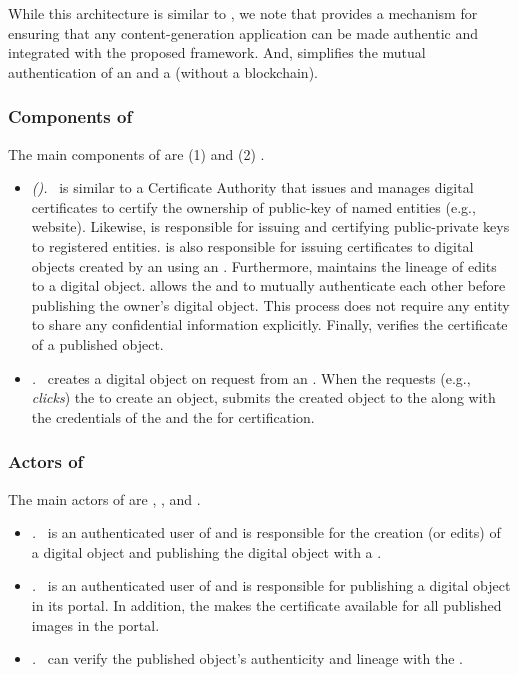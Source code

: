 While this architecture is similar to \cite{qqjs19}, we note that \name provides a mechanism for ensuring that any content-generation application can be made authentic and integrated with the proposed framework. And, \name simplifies the mutual authentication of an \owner and a \publisher (without a blockchain). 

\subsubsection{\bf Components of \name} 
The main components of \name are (1) \TA and (2) \AuthApp.

\begin{itemize}
  \item {\em \TA (\ta). } \
    \ta is similar to a Certificate Authority that issues and manages digital certificates to certify the ownership of public-key of named entities (e.g., website). Likewise, \ta is responsible for issuing and certifying public-private keys to registered entities. \ta is also responsible for issuing certificates to digital objects created by an \owner using an \authapp. Furthermore, \ta maintains the lineage of edits to a digital object. \ta allows the \publisher and \owner to mutually authenticate each other before publishing the owner's digital object. This process does not require any entity to share any confidential information explicitly. Finally, \ta verifies the certificate of a published object. 
  \item {\em \AuthApp. } \
    \AuthApp creates a digital object on request from an \owner. When the \owner requests (e.g., {\em clicks}) the \app to create an object, \app submits the created object to the \ta along with the credentials of the \app and the \owner for certification.
\end{itemize}

\subsubsection{\bf Actors of \name}
The main actors of \name are \owner, \publisher, and \reader. 

\begin{itemize}
  \item {\em \Owner. } \
    \Owner is an authenticated user of \ta and is responsible for the creation (or edits) of a digital object and publishing the digital object with a \publisher. 
  \item {\em \Publisher. } \
    \Publisher is an authenticated user of \ta and is responsible for publishing a digital object in its portal. In addition, the \publisher makes the certificate available for all published images in the portal. 
  \item {\em \Reader. } \
    \Reader can verify the published object's authenticity and lineage with the \ta. 
\end{itemize}

